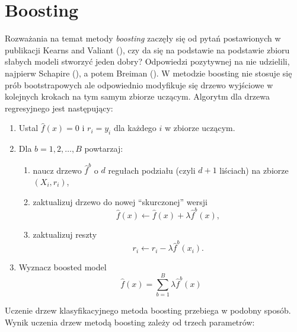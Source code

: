 \documentclass[
]{book}
\providecommand{\tightlist}{%
  \setlength{\itemsep}{0pt}\setlength{\parskip}{0pt}}
\theoremstyle{plain}
\theoremstyle{definition}
\theoremstyle{definition}
\theoremstyle{definition}
\theoremstyle{definition}
\theoremstyle{definition}
\theoremstyle{remark}
\begin{document}
\section{Boosting}\label{boosting}

Rozważania na temat metody \emph{boosting} zaczęły się od pytań postawionych w publikacji Kearns and Valiant (), czy da się na podstawie na podstawie zbioru słabych modeli stworzyć jeden dobry? Odpowiedzi pozytywnej na nie udzielili, najpierw Schapire (), a potem Breiman (). W metodzie boosting nie stosuje się prób bootstrapowych ale odpowiednio modyfikuje się drzewo wyjściowe w kolejnych krokach na tym samym zbiorze uczącym. Algorytm dla drzewa regresyjnego jest następujący:

\begin{enumerate}
\def\labelenumi{\arabic{enumi}.}
\tightlist
\item
  Ustal \(\hat{f}(x)=0\) i \(r_i=y_i\) dla każdego \(i\) w zbiorze uczącym.
\item
  Dla \(b=1,2,\ldots, B\) powtarzaj:

  \begin{enumerate}
  \def\labelenumii{\alph{enumii})}
  \tightlist
  \item
    naucz drzewo \(\hat{f}^b\) o \(d\) regułach podziału (czyli \(d+1\) liściach) na zbiorze \((X_i, r_i)\),
  \item
    zaktualizuj drzewo do nowej ``skurczonej'' wersji
    \begin{equation}
     \hat{f}(x)\leftarrow \hat{f}(x)+\lambda\hat{f}^b(x),
    \end{equation}
  \item
    zaktualizuj reszty
    \begin{equation}
     r_i\leftarrow r_i-\lambda\hat{f}^b(x_i).
    \end{equation}
  \end{enumerate}
\item
  Wyznacz boosted model
  \begin{equation}
    \hat{f}(x) = \sum_{b=1}^B\lambda\hat{f}^b(x)
  \end{equation}
\end{enumerate}

Uczenie drzew klasyfikacyjnego metoda boosting przebiega w podobny sposób. Wynik uczenia drzew metodą boosting zależy od trzech parametrów:
\end{document}
